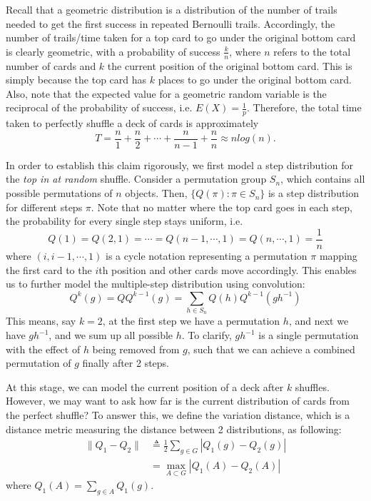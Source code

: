 \documentclass[12pt]{article}
\theoremstyle{plain}
\theoremstyle{definition}
\theoremstyle{remark}
\begin{document}
Recall that a geometric distribution is a distribution of the number of trails needed to get the first success in repeated Bernoulli trails. Accordingly, the number of trails/time taken for a top card to go under the original bottom card is clearly geometric, with a probability of success $\frac{k}{n}$, where $n$ refers to the total number of cards and $k$ the current position of the original bottom card. This is simply because the top card has $k$ places to go under the original bottom card. Also, note that the expected value for a geometric random variable is the reciprocal of the probability of success, i.e. $E(X)=\frac{1}{p}$. Therefore, the total time taken to perfectly shuffle a deck of cards is approximately $$T = \frac{n}{1} + \frac{n}{2} + \cdots + \frac{n}{n-1} + \frac{n}{n} \approx nlog(n).$$

In order to establish this claim rigorously, we first model a step distribution for the \textit{top in at random} shuffle. Consider a permutation group $S_n$, which contains all possible permutations of $n$ objects. Then, $\{Q(\pi):\pi \in S_n\}$ is a step distribution for different steps $\pi$. Note that no matter where the top card goes in each step, the probability for every single step stays uniform, i.e.  $$Q(1)=Q(2,1)=\cdots=Q(n-1,\cdots,1)=Q(n,\cdots,1)=\frac{1}{n}$$ where $(i,i-1,\cdots,1)$ is a cycle notation representing a permutation $\pi$ mapping the first card to the $i$th position and other cards move accordingly. This enables us to further model the multiple-step distribution using convolution\cite[\pno~334]{1.1}: $$Q^k(g)=QQ^{k-1}(g)=\sum_{h\in S_n}Q(h)Q^{k-1}(gh^{-1})$$
This means, say $k=2$, at the first step we have a permutation $h$, and next we have $gh^{-1}$, and we sum up all possible $h$. To clarify, $gh^{-1}$ is a single permutation with the effect of $h$ being removed from $g$, such that we can achieve a combined permutation of $g$ finally after 2 steps.

At this stage, we can model the current position of a deck after $k$ shuffles. However, we may want to ask how far is the current distribution of cards from the perfect shuffle? To answer this, we define the variation distance, which is a distance metric measuring the distance between 2 distributions, as following\cite[\pno~335]{1.1}:
\begin{equation*}
\begin{split}
    \|Q_1-Q_2\|&\triangleq \frac{1}{2}\sum_{g\in G}|Q_1(g)-Q_2(g)|\\
    &=\max_{A\subset G}|Q_1(A)-Q_2(A)|
\end{split}
\end{equation*}
where $Q_1(A)=\sum_{g\in A}Q_1(g)$.
\end{document}
